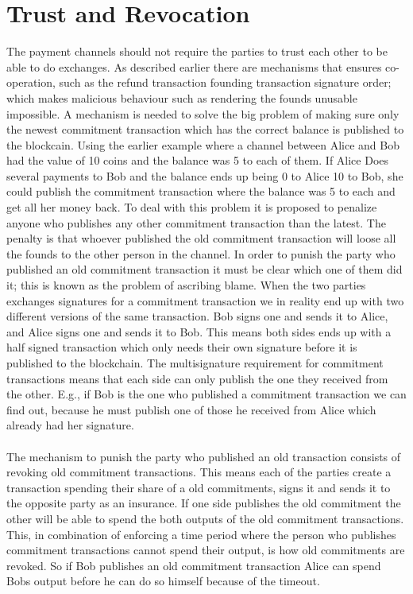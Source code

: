 \documentclass[informationsecurity]{gucmasterproject}
\begin{document}
\section{Trust and Revocation}

The payment channels should not require the parties to trust each other to be able to do exchanges.
As described earlier there are mechanisms that ensures co-operation, such as the refund transaction founding transaction signature order; which makes malicious behaviour such as rendering the founds unusable impossible. A mechanism is needed to solve the big problem of making sure only the newest commitment transaction which has the correct balance is published to the blockcain. Using the earlier example where a channel between Alice and Bob had the value of 10 coins and the balance was 5 to each of them. If Alice Does several payments to Bob and the balance ends up being 0 to Alice 10 to Bob, she could publish the commitment transaction where the balance was 5 to each and get all her money back. To deal with this problem it is proposed to penalize anyone who publishes any other commitment transaction than the latest. The penalty is that whoever published the old commitment transaction will loose all the founds to the other person in the channel.
In order to punish the party who published an old commitment transaction it must be clear which one of them did it; this is known as the problem of ascribing blame. When the two parties exchanges signatures for a commitment transaction we in reality end up with two different versions of the same transaction. Bob signs one and sends it to Alice, and Alice signs one and sends it to Bob. This means both sides ends up with a half signed transaction which only needs their own signature before it is published to the blockchain. The multisignature requirement for commitment transactions means that each side can only publish the one they received from the other.
E.g., if Bob is the one who published a commitment transaction we can find out, because he must publish one of those he received from Alice which already had her signature.

\paragraph{}
The mechanism to punish the party who published an old transaction consists of revoking old commitment transactions. This means each of the parties create a transaction spending their share of a old commitments, signs it and sends it to the opposite party as an insurance. If one side publishes the old commitment  the other will be able to spend the both outputs of the old commitment transactions. This, in combination of enforcing a time period where the person who publishes commitment transactions cannot spend their output, is how old commitments are revoked. So if Bob publishes an old commitment transaction Alice can spend Bobs output before he can do so himself because of the timeout.
\end{document}
